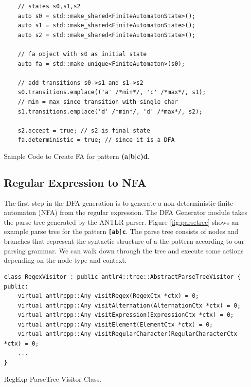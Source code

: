 \begin{listing}[H]
\begin{verbatim}
    // states s0,s1,s2
    auto s0 = std::make_shared<FiniteAutomatonState>();
    auto s1 = std::make_shared<FiniteAutomatonState>();
    auto s2 = std::make_shared<FiniteAutomatonState>();
    
    // fa object with s0 as initial state
    auto fa = std::make_unique<FiniteAutomaton>(s0);
    
    // add transitions s0->s1 and s1->s2
    s0.transitions.emplace(('a' /*min*/, 'c' /*max*/, s1);
    // min = max since transition with single char
    s1.transitions.emplace('d' /*min*/, 'd' /*max*/, s2);
    
    s2.accept = true; // s2 is final state
    fa.deterministic = true; // since it is a DFA
\end{verbatim}
\caption[Sample Code to Create FA for pattern]{Sample Code to Create FA for pattern \textbf{(a|b|c)d}.}\label{lst:faexamplecode}
\end{listing}


\subsection{Regular Expression to NFA}\label{subsection:regexnfa}
The first step in the DFA generation is to generate a non deterministic finite automaton (NFA) from the regular expression. The DFA Generator module takes the parse tree generated by the ANTLR parser. Figure \ref{fig:parsetree} shows an example parse tree for the pattern \texttt{\textbf{[ab]c}}. The parse tree consists of nodes and branches that represent the syntactic structure of a the pattern according to our parsing grammar. We can walk down through the tree and execute some actions depending on the node type and context.

\begin{listing}[H]
\begin{verbatim}
class RegexVisitor : public antlr4::tree::AbstractParseTreeVisitor {
public:
    virtual antlrcpp::Any visitRegex(RegexCtx *ctx) = 0;
    virtual antlrcpp::Any visitAlternation(AlternationCtx *ctx) = 0;
    virtual antlrcpp::Any visitExpression(ExpressionCtx *ctx) = 0;
    virtual antlrcpp::Any visitElement(ElementCtx *ctx) = 0;
    virtual antlrcpp::Any visitRegularCharacter(RegularCharacterCtx *ctx) = 0;
    ...
}
\end{verbatim}
\caption{RegExp ParseTree Visitor Class.}\label{lst:fasvisitor}
\end{listing}

